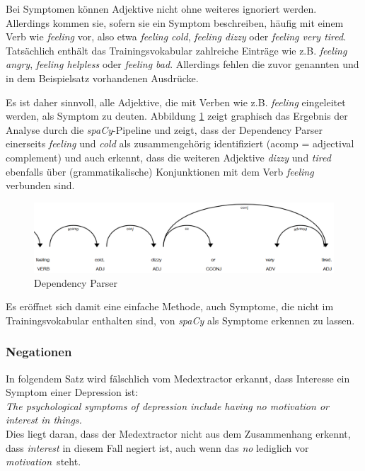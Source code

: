 Bei Symptomen können Adjektive nicht ohne weiteres ignoriert werden. Allerdings kommen sie, sofern sie ein Symptom beschreiben, häufig mit einem Verb wie \emph{feeling} vor, also etwa \emph{feeling cold}, \emph{feeling dizzy} oder \emph{feeling very tired}. Tatsächlich enthält das Trainingsvokabular zahlreiche Einträge wie z.B. \emph{feeling angry}, \emph{feeling helpless} oder \emph{feeling bad}. Allerdings fehlen die zuvor genannten und in dem Beispielsatz vorhandenen Ausdrücke.

Es ist daher sinnvoll, alle Adjektive, die mit Verben wie z.B. \emph{feeling} eingeleitet werden, als Symptom zu deuten. Abbildung \ref{fig:dep_parser} zeigt graphisch das Ergebnis der Analyse durch die \emph{spaCy}-Pipeline und zeigt, dass der Dependency Parser einerseits \emph{feeling} und \emph{cold} als zusammengehörig identifiziert (acomp = adjectival complement) und auch erkennt, dass die weiteren Adjektive \emph{dizzy} und \emph{tired} ebenfalls über (grammatikalische) Konjunktionen mit dem Verb \emph{feeling} verbunden sind.

\begin{figure}[h]
    \centering
    \includegraphics[width=\textwidth]{pictures/Dep_Parser.png}
    \caption{Dependency Parser}
    \label{fig:dep_parser}
\end{figure}

Es eröffnet sich damit eine einfache Methode, auch Symptome, die nicht im Trainingsvokabular enthalten sind, von \emph{spaCy} als Symptome erkennen zu lassen.

\subsubsection{Negationen}
\label{subsec: negations} 

In folgendem Satz wird fälschlich vom Medextractor erkannt, dass Interesse ein Symptom einer Depression ist:\\

\emph{\glqq The psychological symptoms of depression include having no motivation or interest in things.\grqq}\\

Dies liegt daran, dass der Medextractor nicht aus dem Zusammenhang erkennt, dass \emph{interest} in diesem Fall negiert ist, auch wenn das \emph{no} lediglich vor \emph{motivation}\ steht. 

